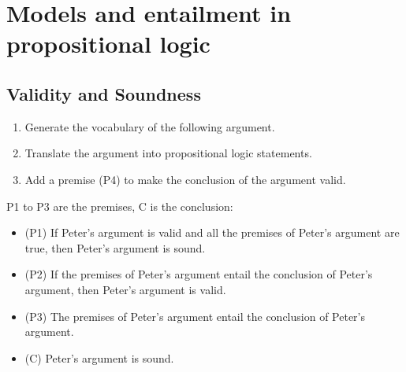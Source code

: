 \section{Models and entailment in propositional logic}
\subsection{Validity and Soundness}
\begin{large}

  \begin{enumerate}[label=(\alph*)]
    \item Generate the vocabulary of the following argument.
    \item Translate the argument into propositional logic statements.
    \item Add a premise (P4) to make the conclusion of the argument valid.
  \end{enumerate}
  P1 to P3 are the premises, C is the conclusion:
  \begin{itemize}
    \item (P1) If Peter’s argument is valid and all the premises of Peter’s argument are true, then Peter’s argument is sound.
    \item (P2) If the premises of Peter’s argument entail the conclusion of Peter’s argument, then Peter’s
          argument is valid.
    \item (P3) The premises of Peter’s argument entail the conclusion of Peter’s argument.
    \item (C) Peter’s argument is sound.
  \end{itemize}


\end{large}


